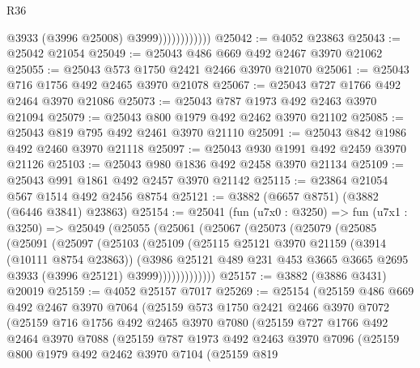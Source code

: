 \begin{lexlean}{R36}
\begin{coremodule}
                            @3933
                            (@3996 @25008)
                            @3999))))))))))))
@25042 := @4052 @23863
@25043 := @25042 @21054
@25049 := @25043 @486 @669 @492 @2467 @3970 @21062
@25055 := @25043 @573 @1750 @2421 @2466 @3970 @21070
@25061 := @25043 @716 @1756 @492 @2465 @3970 @21078
@25067 := @25043 @727 @1766 @492 @2464 @3970 @21086
@25073 := @25043 @787 @1973 @492 @2463 @3970 @21094
@25079 := @25043 @800 @1979 @492 @2462 @3970 @21102
@25085 := @25043 @819 @795 @492 @2461 @3970 @21110
@25091 := @25043 @842 @1986 @492 @2460 @3970 @21118
@25097 := @25043 @930 @1991 @492 @2459 @3970 @21126
@25103 := @25043 @980 @1836 @492 @2458 @3970 @21134
@25109 := @25043 @991 @1861 @492 @2457 @3970 @21142
@25115 := @23864 @21054 @567 @1514 @492 @2456 @8754
@25121 := @3882 (@6657 @8751) (@3882 (@6446 @3841) @23863)
@25154 := @25041
    (fun (u7x0 : @3250) =>
    fun (u7x1 : @3250) =>
    @25049
      (@25055
        (@25061
          (@25067
            (@25073
              (@25079
                (@25085
                  (@25091
                    (@25097
                      (@25103
                        (@25109
                          (@25115
                            @25121
                            @3970
                            @21159
                            (@3914 (@10111 @8754 @23863))
                            (@3986
                              @25121
                              @489
                              @231
                              @453
                              @3665
                              @3665
                              @2695
                              @3933
                              (@3996 @25121)
                              @3999)))))))))))))
@25157 := @3882 (@3886 @3431) @20019
@25159 := @4052 @25157 @7017
@25269 := @25154
    (@25159
      @486
      @669
      @492
      @2467
      @3970
      @7064
      (@25159
        @573
        @1750
        @2421
        @2466
        @3970
        @7072
        (@25159
          @716
          @1756
          @492
          @2465
          @3970
          @7080
          (@25159
            @727
            @1766
            @492
            @2464
            @3970
            @7088
            (@25159
              @787
              @1973
              @492
              @2463
              @3970
              @7096
              (@25159
                @800
                @1979
                @492
                @2462
                @3970
                @7104
                (@25159
                  @819

\end{coremodule}
\end{lexlean}
